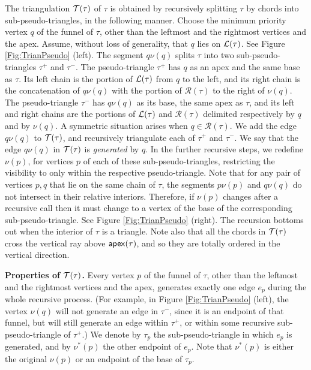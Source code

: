 \documentclass[11pt]{article}
\def\T{{\cal T}}
\def\L{{\cal L}}
\def\R{\mathcal{R}}
\def\apex{{\sf apex}}
\begin{document}
The triangulation $\T(\tau)$ of $\tau$ is obtained by recursively
splitting $\tau$ by chords into sub-pseudo-triangles, in the following
manner.  Choose the minimum priority vertex $q$ of the funnel of
$\tau$, other than the leftmost and the rightmost vertices and the
apex. Assume, without loss of generality, that $q$ lies on
$\L(\tau)$. See Figure \ref{Fig:TrianPseudo} (left). The segment $q\nu(q)$ splits $\tau$ into two
sub-pseudo-triangles $\tau^+$ and $\tau^-$. The pseudo-triangle $\tau^+$ has $q$ as an
apex and the same base as $\tau$. Its left chain is the portion of
$\L(\tau)$ from $q$ to the left, and its right chain is the
concatenation of $q\nu(q)$ with the portion of $\R(\tau)$ to the right
of $\nu(q)$. The pseudo-triangle $\tau^-$ has $q\nu(q)$ as its base, the
same apex as $\tau$, and its left and right chains are the portions of
$\L(\tau)$ and $\R(\tau)$ delimited respectively by $q$ and by
$\nu(q)$. A symmetric situation arises when $q\in \R(\tau)$. We add the
edge $q\nu(q)$ to $\T(\tau)$, and recursively triangulate each of
$\tau^+$ and $\tau^-$. We say that the edge $q\nu(q)$ in $\T(\tau)$ is
\textit{generated} by $q$.  In the further recursive steps, we redefine
$\nu(p)$, for vertices $p$ of each of these sub-pseudo-triangles,
restricting the visibility to only within the respective
pseudo-triangle. 
Note that for any pair of vertices $p,q$ that lie on the same chain of $\tau$, the segments $p\nu(p)$ and $q\nu(q)$ do not intersect in their relative interiors. Therefore, if $\nu(p)$ changes after a recursive call then it must change to a vertex of the base of the corresponding sub-pseudo-triangle.
See Figure \ref{Fig:TrianPseudo} (right). 
The recursion
bottoms out when the interior of $\tau$ is a triangle.
Note also that all the chords in $\T(\tau)$ cross the vertical ray above $\apex(\tau)$, and so they are totally ordered in the vertical direction.

\medskip
\noindent
{\bf Properties of $\T(\tau)$.}
Every vertex $p$ of the funnel of $\tau$, other than the leftmost and the rightmost vertices and the apex, generates exactly one edge $e_p$ during the whole recursive process. (For example, in Figure \ref{Fig:TrianPseudo} (left), the vertex $\nu(q)$ will not generate an edge in $\tau^-$, since it is an endpoint of that funnel, but will still generate an edge within $\tau^+$, or within some recursive sub-pseudo-triangle of $\tau^+$.) 
We denote by $\tau_p$ the sub-pseudo-triangle in which $e_p$ is generated, and by $\nu^*(p)$ the other endpoint of $e_p$. Note that $\nu^*(p)$ is either the original $\nu(p)$ or an endpoint of the base of $\tau_p$.
\end{document}
